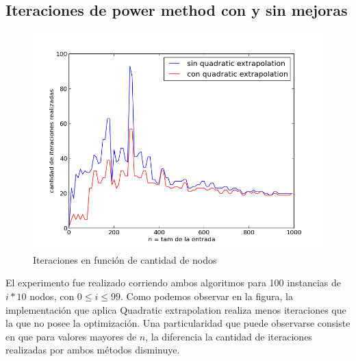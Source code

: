 \subsection{Iteraciones de power method con y sin mejoras} 

\begin{figure}[!h]
        \begin{center}
                  \includegraphics[scale = 0.6]{graficos/vs.png}
                  \caption{Iteraciones en función de cantidad de nodos}
                  \label{fig:contra1}
        \end{center}
\end{figure}
\FloatBarrier

El experimento fue realizado corriendo ambos algoritmos para 100 instancias de $i*10$ nodos,
con $0 \leq i \leq 99$.
Como podemos observar en la figura, la implementación que aplica Quadratic extrapolation realiza menos iteraciones
que la que no posee la optimización. Una particularidad que puede observarse consiste en que para valores mayores de $n$, la diferencia
la cantidad de iteraciones realizadas por ambos métodos disminuye.
